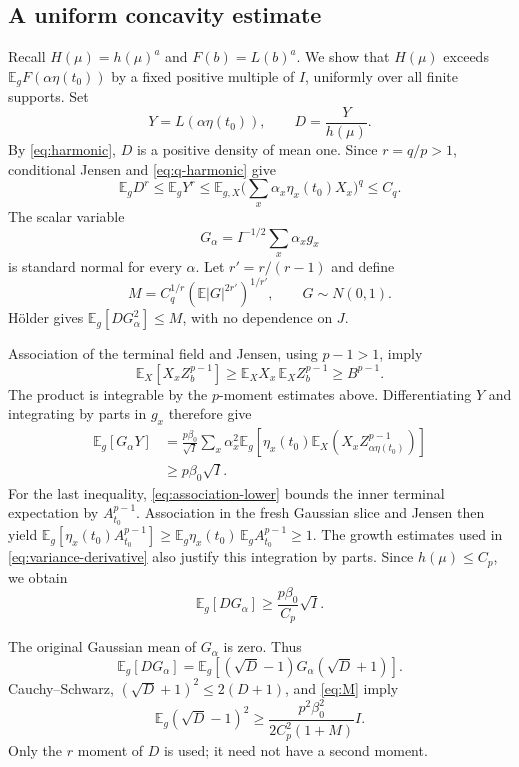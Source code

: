 \documentclass[11pt]{amsart}
\newcommand{\E}{\mathbb E}
\theoremstyle{remark}
\numberwithin{equation}{section}
\begin{document}
\subsection{A uniform concavity estimate}
Recall $H(\mu)=h(\mu)^a$ and $F(b)=L(b)^a$.
We show that $H(\mu)$ exceeds $\E_gF(\alpha\eta(t_0))$ by a fixed
positive multiple of $I$, uniformly over all finite supports.
Set
\[
 Y=L(\alpha\eta(t_0)),\qquad D=\frac{Y}{h(\mu)}.
\]
By \eqref{eq:harmonic}, $D$ is a positive density of mean one. Since $r=q/p>1$,
conditional Jensen and \eqref{eq:q-harmonic} give
\begin{equation}\label{eq:density-moment}
 \E_gD^r\le\E_gY^r
 \le\E_{g,X}\Big(\sum_x\alpha_x\eta_x(t_0)X_x\Big)^q\le C_q.
\end{equation}
The scalar variable
\[
 G_\alpha=I^{-1/2}\sum_x\alpha_xg_x
\]
is standard normal for every $\alpha$. Let $r'=r/(r-1)$ and define
\begin{equation}\label{eq:M}
 M=C_q^{1/r}(\E|G|^{2r'})^{1/r'},\qquad G\sim N(0,1).
\end{equation}
H\"older gives $\E_g[D G_\alpha^2]\le M$, with no dependence on $J$.

Association of the terminal field and Jensen, using $p-1>1$, imply
\begin{equation}\label{eq:association-lower}
 \E_X[X_xZ_b^{p-1}]
 \ge \E_XX_x\,\E_XZ_b^{p-1}\ge B^{p-1}.
\end{equation}
The product is integrable by the $p$-moment estimates above. Differentiating
$Y$ and integrating by parts in $g_x$ therefore give
\begin{align*}
 \E_g[G_\alpha Y]
 &=\frac{p\beta_0}{\sqrt I}\sum_x\alpha_x^2
   \E_g\!\left[\eta_x(t_0)\E_X(X_x Z_{\alpha\eta(t_0)}^{p-1})\right]\\
 &\ge p\beta_0\sqrt I.
\end{align*}
For the last inequality, \eqref{eq:association-lower} bounds the inner terminal
expectation by $A_{t_0}^{p-1}$. Association in the fresh Gaussian slice and
Jensen then yield
$\E_g[\eta_x(t_0)A_{t_0}^{p-1}]\ge\E_g\eta_x(t_0)\,\E_gA_{t_0}^{p-1}\ge1$.
The growth estimates used in \eqref{eq:variance-derivative} also justify this
integration by parts. Since $h(\mu)\le C_p$, we obtain
\begin{equation}\label{eq:shift}
 \E_g[D G_\alpha]\ge\frac{p\beta_0}{C_p}\sqrt I.
\end{equation}

The original Gaussian mean of $G_\alpha$ is zero. Thus
\[
 \E_g[D G_\alpha]
 =\E_g[(\sqrt D-1)G_\alpha(\sqrt D+1)].
\]
Cauchy--Schwarz, $(\sqrt D+1)^2\le2(D+1)$, and \eqref{eq:M} imply
\begin{equation}\label{eq:hellinger}
 \E_g(\sqrt D-1)^2
 \ge\frac{p^2\beta_0^2}{2C_p^2(1+M)}I.
\end{equation}
Only the $r$ moment of $D$ is used; it need not have a second moment.
\end{document}
